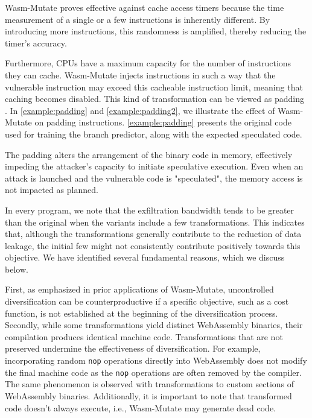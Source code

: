 \documentclass[a4paper,fleqn]{cas-dc}
\newcommand{\tool}{{\sc Wasm-Mutate}\xspace}
\newcommand{\Wasm}{WebAssembly\xspace}
\newcommand{\wasm}{\Wasm}
\begin{document}


\tool proves effective against cache access timers because the time measurement of a single or a few instructions is inherently different. 
By introducing more instructions, this randomness is amplified, thereby reducing the timer's accuracy.


Furthermore, CPUs have a maximum capacity for the number of instructions they can cache.
\tool injects instructions in such a way that the vulnerable instruction may exceed this cacheable instruction limit, meaning that caching becomes disabled.
This kind of transformation can be viewed as padding \cite{padding}.
In \autoref{example:padding} and \autoref{example:padding2}, we illustrate the effect of \tool on padding instructions.
\autoref{example:padding} presents the original code used for training the branch predictor, along with the expected speculated code.



The padding alters the arrangement of the binary code in memory, effectively impeding the attacker's capacity to initiate speculative execution.
Even when an attack is launched and the vulnerable code is "speculated", the memory access is not impacted as planned.


In every program, we note that the exfiltration bandwidth tends to be greater than the original when the variants include a few transformations.
This indicates that, although the transformations generally contribute to the reduction of data leakage, the initial few might not consistently contribute positively towards this objective.
We have identified several fundamental reasons, which we discuss below.

First, as emphasized in prior applications of \tool \cite{CABRERAARTEAGA2023103296}, uncontrolled diversification can be counterproductive if a specific objective, such as a cost function, is not established at the beginning of the diversification process.
Secondly, while some transformations yield distinct \wasm binaries, their compilation produces identical machine code.
Transformations that are not preserved undermine the effectiveness of diversification.
For example, incorporating random \texttt{nop} operations directly into \wasm does not modify the final machine code as the \texttt{nop} operations are often removed by the compiler.
The same phenomenon is observed with transformations to custom sections of \Wasm binaries.
Additionally, it is important to note that transformed code doesn't always execute, i.e., \tool may generate dead code.
\end{document}
